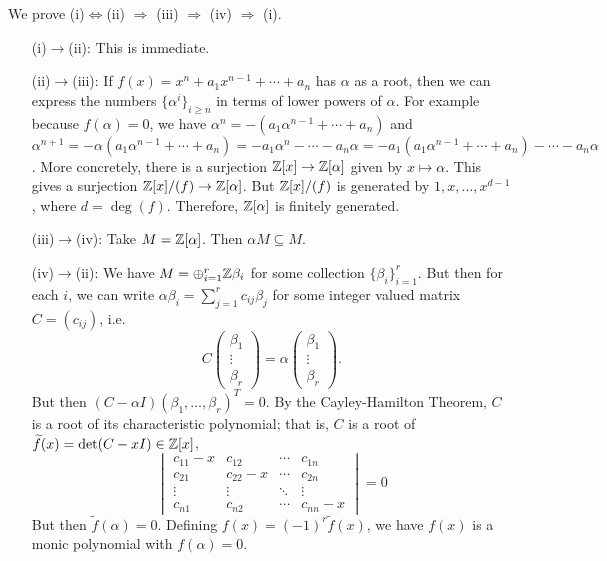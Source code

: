 \pf We prove (i)$\iff$(ii) $\Rightarrow$ (iii) $\Rightarrow$ (iv) $\Rightarrow$ (i). 
\begin{enumerate}
\item[(i)$\to$(ii):] This is immediate.

\item[(ii)$\to$(iii):] If $f(x)=x^n + a_1x^{n-1} + \cdots + a_n$ has $\alpha$ as a root, then we can express the numbers $\{\alpha^i\}_{i \geq n}$ in terms of lower powers of $\alpha$. For example because $f(\alpha)= 0$, we have $\alpha^n= -(a_1\alpha^{n-1} + \cdots + a_n)$ and $\alpha^{n+1}= -\alpha (a_1\alpha^{n-1} + \cdots + a_n)= -a_1\alpha^n - \cdots - a_n\alpha= -a_1 (a_1\alpha^{n-1} + \cdots + a_n) - \cdots - a_n \alpha$. More concretely, there is a surjection $\mathbb{Z}[x] \to \mathbb{Z}[\alpha]$ given by $x \mapsto \alpha$. This gives a surjection $\mathbb{Z}[x]/(f) \to \mathbb{Z}[\alpha]$. But $\mathbb{Z}[x]/(f)$ is generated by $1,x,\ldots,x^{d-1}$, where $d=\deg(f)$. Therefore, $\mathbb{Z}[\alpha]$ is finitely generated. 

\item[(iii)$\to$(iv):] Take $M= \mathbb{Z}[\alpha]$. Then $\alpha M \subseteq M$. 

\item[(iv)$\to$(ii):] We have $M= \oplus_{i=1}^r \mathbb{Z} \beta_i$ for some collection $\{ \beta_i \}_{i=1}^r$. But then for each $i$, we can write $\alpha \beta_i= \sum_{j=1}^r c_{ij} \beta_j$ for some integer valued matrix $C= (c_{ij})$, i.e.
	\[
	C \begin{pmatrix} \beta_1 \\ \vdots \\ \beta_r \end{pmatrix}= \alpha \begin{pmatrix} \beta_1 \\ \vdots \\ \beta_r \end{pmatrix}.
	\]
But then $(C - \alpha I)(\beta_1,\ldots, \beta_r)^T= 0$. By the Cayley-Hamilton Theorem, $C$ is a root of its characteristic polynomial; that is, $C$ is a root of $\widetilde{f}(x)= \det(C - xI) \in \mathbb{Z}[x]$,
	\[
	\begin{vmatrix}
	c_{11} - x & c_{12} & \cdots & c_{1n} \\
	c_{21} & c_{22} - x & \cdots & c_{2n} \\
	\vdots & \vdots & \ddots & \vdots \\
	c_{n1} & c_{n2} & \cdots & c_{nn} - x 
	\end{vmatrix}= 0
	\]
 But then $\widetilde{f}(\alpha)= 0$. Defining $f(x)= (-1)^r \widetilde{f}(x)$, we have $f(x)$ is a monic polynomial with $f(\alpha)= 0$. 


\end{enumerate}

